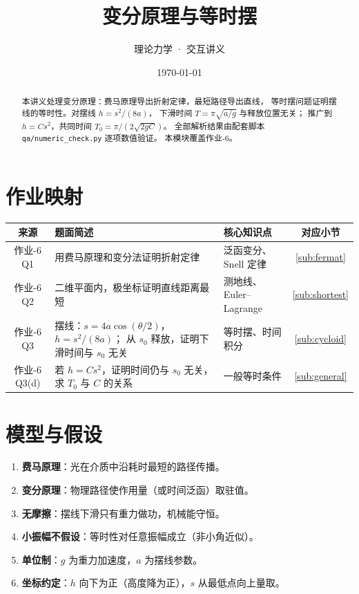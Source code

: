 \documentclass[UTF8,a4paper,11pt]{ctexart}
\title{\textbf{变分原理与等时摆}}
\author{理论力学 · 交互讲义}
\date{\today}
\begin{document}
\maketitle

\begin{abstract}
本讲义处理变分原理：费马原理导出折射定律，最短路径导出直线，
等时摆问题证明摆线的等时性。对摆线 $h=s^2/(8a)$，
下滑时间 $T=\pi\sqrt{a/g}$ 与释放位置无关；
推广到 $h=C s^2$，共同时间 $T_0=\pi/(2\sqrt{2gC})$。
全部解析结果由配套脚本 \texttt{qa/numeric\_check.py} 逐项数值验证。
本模块覆盖作业-6。
\end{abstract}

\tableofcontents
\newpage

\section{作业映射}
\label{sec:map}

\begin{center}
\small
\begin{tabular}{cp{6.5cm}p{3.5cm}c}
\toprule
来源 & 题面简述 & 核心知识点 & 对应小节 \\
\midrule
作业-6 Q1 & 用费马原理和变分法证明折射定律 &
  泛函变分、Snell 定律 & \ref{sub:fermat} \\
作业-6 Q2 & 二维平面内，极坐标证明直线距离最短 &
  测地线、Euler--Lagrange & \ref{sub:shortest} \\
作业-6 Q3 & 摆线：$s=4a\cos(\theta/2)$，$h=s^2/(8a)$；
  从 $s_0$ 释放，证明下滑时间与 $s_0$ 无关 &
  等时摆、时间积分 & \ref{sub:cycloid} \\
作业-6 Q3(d) & 若 $h=C s^2$，证明时间仍与 $s_0$ 无关，求 $T_0$ 与 $C$ 的关系 &
  一般等时条件 & \ref{sub:general} \\
\bottomrule
\end{tabular}
\end{center}

\section{模型与假设}
\label{sec:model}

\begin{enumerate}
  \item \textbf{费马原理}：光在介质中沿耗时最短的路径传播。
  \item \textbf{变分原理}：物理路径使作用量（或时间泛函）取驻值。
  \item \textbf{无摩擦}：摆线下滑只有重力做功，机械能守恒。
  \item \textbf{小振幅不假设}：等时性对任意振幅成立（非小角近似）。
  \item \textbf{单位制}：$g$ 为重力加速度，$a$ 为摆线参数。
\item \textbf{坐标约定}：$h$ 向下为正（高度降为正），$s$ 从最低点向上量取。
\end{enumerate}
\end{document}
